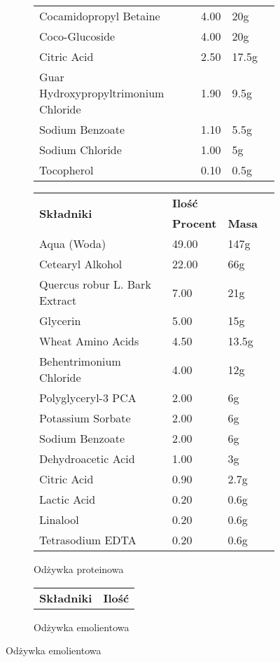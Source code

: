 {\begin{figure}[H]
\begin{footnotesize}
\begin{subfigure}[t]{0.5\textwidth}
\begin{tabular}{p{}lll}
			Cocamidopropyl Betaine & 4.00 & 20g  \\
			Coco-Glucoside & 4.00 & 20g  \\
			Citric Acid & 2.50 & 17.5g  \\
			Guar Hydroxypropyltrimonium Chloride & 1.90 & 9.5g  \\
			Sodium Benzoate & 1.10 & 5.5g  \\
			Sodium Chloride & 1.00 & 5g \\
			Tocopherol & 0.10 & 0.5g  \\
			\hline
		\end{tabular}
	\end{subfigure}

	\begin{subfigure}[t]{0.45\textwidth}
		\centering
		\caption{Odżywka proteinowa}
		\begin{tabular}{p{}lll}
			\hline
			\multirow{2}{*}{\textbf{Składniki}} & \multicolumn{2}{l}{\textbf{Ilość}} \\
			\cline{2-3}
			& \textbf{Procent} & \textbf{Masa} \\
			\hline\hline
			Aqua (Woda)  & 49.00 & 147g \\
			Cetearyl Alkohol  & 22.00 & 66g \\
			Quercus robur L. Bark Extract   & 7.00 & 21g \\
			Glycerin  & 5.00 & 15g \\
			Wheat Amino Acids   & 4.50 & 13.5g \\
			Behentrimonium Chloride  & 4.00 & 12g \\
			Polyglyceryl-3 PCA  & 2.00 & 6g \\
			Potassium Sorbate  & 2.00 & 6g \\
			Sodium Benzoate  & 2.00 & 6g \\
			Dehydroacetic Acid  & 1.00 & 3g \\
			Citric Acid  & 0.90 & 2.7g \\
			Lactic Acid  & 0.20 & 0.6g \\
			Linalool & 0.20 & 0.6g \\
			Tetrasodium EDTA  & 0.20 & 0.6g \\
			\hline
		\end{tabular}
	\end{subfigure}
	\begin{subfigure}[t]{0.5\textwidth}
		\centering
		\caption{Odżywka emolientowa}
		\begin{tabular}{p{}ll}
			\hline
			\multirow{2}{*}{\textbf{Składniki}} & \multicolumn{2}{l}{\textbf{Ilość}} \\

\end{tabular}
\end{subfigure}
\end{footnotesize}
\end{figure}}
